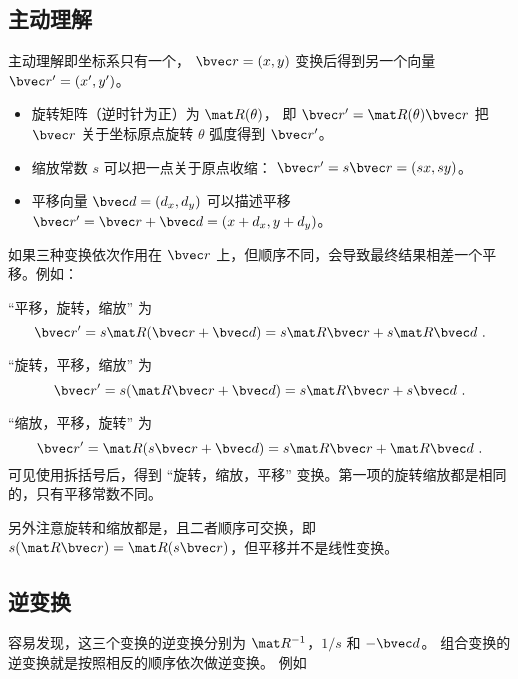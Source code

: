 

\subsection{主动理解}
主动理解即坐标系只有一个， $\bvec r = (x, y)$ 变换后得到另一个向量 $\bvec r' = (x',y')$。

\begin{itemize}
\item 旋转矩阵（逆时针为正）为 $\mat R(\theta)$， 即 $\bvec r' = \mat R(\theta)\bvec r$ 把 $\bvec r$ 关于坐标原点旋转 $\theta$ 弧度得到 $\bvec r'$。
\item 缩放常数 $s$ 可以把一点关于原点收缩： $\bvec r' = s\bvec r = (sx, sy)$。
\item 平移向量 $\bvec d = (d_x,d_y)$ 可以描述平移 $\bvec r' = \bvec r + \bvec d = (x+d_x,y+d_y)$。
\end{itemize}

如果三种变换依次作用在 $\bvec r$ 上，但顺序不同，会导致最终结果相差一个平移。例如：

“平移，旋转，缩放” 为
\begin{equation}
\bvec r' = s\mat R (\bvec r + \bvec d) = s\mat R\bvec r + s\mat R\bvec d~.
\end{equation}

“旋转，平移，缩放” 为
\begin{equation}
\bvec r' = s(\mat R\bvec r + \bvec d) = s\mat R\bvec r + s\bvec d~.
\end{equation}

“缩放，平移，旋转” 为
\begin{equation}\label{eq_TrRoSc_1}
\bvec r' = \mat R(s\bvec r + \bvec d) = s\mat R\bvec r + \mat R\bvec d~.
\end{equation}
可见使用拆括号后，得到 “旋转，缩放，平移” 变换。第一项的旋转缩放都是相同的，只有平移常数不同。

另外注意旋转和缩放都是，且二者顺序可交换，即 $s(\mat R\bvec r) = \mat R (s \bvec r)$，但平移并不是线性变换。

\subsection{逆变换}
容易发现，这三个变换的逆变换分别为 $\mat R^{-1}$，$1/s$ 和 $-\bvec d$。 组合变换的逆变换就是按照相反的顺序依次做逆变换。 例如

